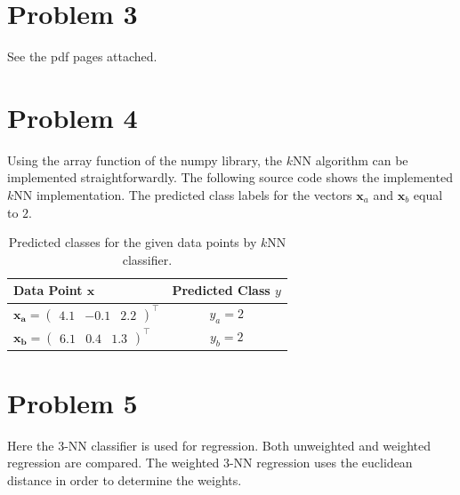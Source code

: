 \documentclass{scrartcl}
\begin{document}
\section{Problem 3}
See the pdf pages attached.

\section{Problem 4}
Using the array function of the numpy library, the $k$NN algorithm can be implemented straightforwardly. The following source code shows the implemented $k$NN implementation.\pagebreak
The predicted class labels for the vectors $\mathbf{x}_a$ and $\mathbf{x}_b$ equal to $2$.



\begin{table}[h]
	\centering

	\begin{tabular}{l|c}
	\hline

	\hline
	\textbf{Data Point} $\mathbf{x}$ & \textbf{Predicted Class} $y$\\
	\hline
		 $\mathbf{x_a} = \begin{pmatrix}
		 	4.1 & -0.1 & 2.2
		 \end{pmatrix}^\top$& $y_a = 2$\\
	\hline
		$\mathbf{x_b} = \begin{pmatrix}
			6.1 & 0.4 & 1.3
		\end{pmatrix}^\top$ & $y_b = 2$\\

	\hline
	\end{tabular}
	\caption{Predicted classes for the given data points by $k$NN classifier.}
	\label{tab:class_predictions}
\end{table}

\section{Problem 5}
Here the 3-NN classifier is used for regression. Both unweighted and weighted regression are compared. The weighted 3-NN regression uses the euclidean distance in order to determine the weights.
\end{document}
